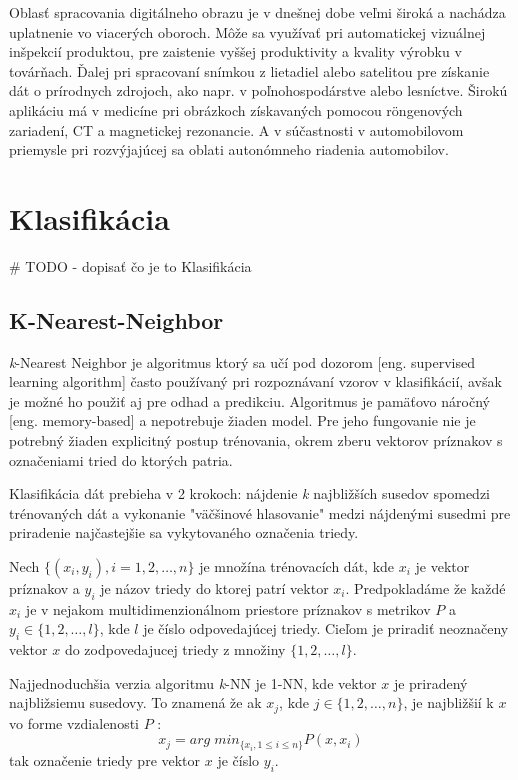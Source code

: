 Oblasť spracovania digitálneho obrazu je v dnešnej dobe veľmi široká a nachádza uplatnenie vo viacerých oboroch.
Môže sa využívať pri automatickej vizuálnej inšpekcií produktou, pre zaistenie vyššej produktivity a kvality výrobku v továrňach.
Ďalej pri spracovaní snímkou z lietadiel alebo satelitou pre získanie dát o prírodnych zdrojoch, ako napr. v poľnohospodárstve alebo lesníctve.
Širokú aplikáciu má v medicíne pri obrázkoch získavaných pomocou röngenových zariadení, CT a magnetickej rezonancie\cite{book:ImageProcessingApplication}.
A v súčastnosti v automobilovom priemysle pri rozvýjajúcej sa oblati autonómneho riadenia automobilov.


\section{Klasifikácia}
\# TODO - dopisať čo je to Klasifikácia


\subsection{K-Nearest-Neighbor}
\textit{k}-Nearest Neighbor je algoritmus ktorý sa učí pod dozorom [eng. supervised learning algorithm] často používaný pri rozpoznávaní vzorov v klasifikácií,
avšak je možné ho použiť aj pre odhad a predikciu\cite{book:DataMining}.
Algoritmus je pamäťovo náročný [eng. memory-based] a nepotrebuje žiaden model.
Pre jeho fungovanie nie je potrebný žiaden explicitný postup trénovania, okrem zberu vektorov príznakov s označeniami tried do ktorých patria.

Klasifikácia dát prebieha v 2 krokoch: nájdenie \textit{k} najbližších susedov spomedzi trénovaných dát a
vykonanie "väčšinové hlasovanie" medzi nájdenými susedmi pre priradenie najčastejšie sa vykytovaného označenia triedy.

Nech $\{ (x_i, y_i), i = 1, 2, \dots, n \}$ je množína trénovacích dát, kde $x_i$ je vektor príznakov a $y_i$ je názov triedy do ktorej patrí vektor $x_i$.
Predpokladáme že každé $x_i$ je v nejakom multidimenzionálnom priestore príznakov s metrikov $P$ a $y_i \in \{ 1, 2, \dots, l \}$, kde $l$ je číslo odpovedajúcej triedy.
Cieľom je priradiť neoznačeny vektor $x$ do zodpovedajucej triedy z množiny $\{ 1, 2, \dots, l \}$.

Najjednoduchšia verzia algoritmu \textit{k}-NN je 1-NN, kde vektor $x$ je priradený najbližsiemu susedovy.
To znamená že ak $x_j$, kde $j \in \{ 1, 2, \dots, n \}$, je najbližšií k $x$ vo forme vzdialenosti $P$ \cite{prop:KnnClassification}:
\begin{equation}
    \label{eq:kNNMetric}
    x_j = arg \; min_{\{x_i, 1 \leq i \leq n\}} P(x, x_i)
\end{equation}
tak označenie triedy pre vektor $x$ je číslo $y_i$.

